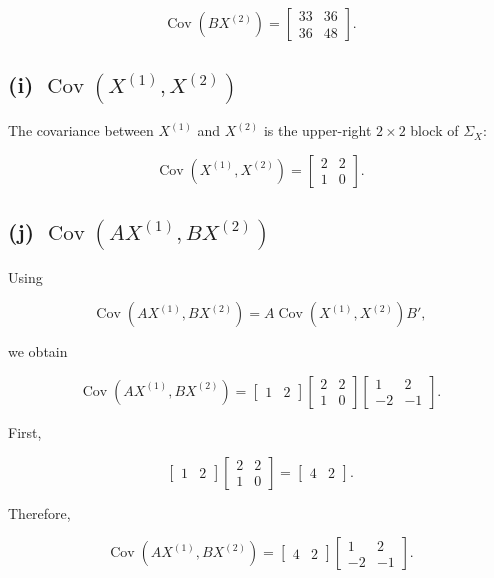 \documentclass[12pt]{article}
\begin{document}
\[
\boxed{
\operatorname{Cov}(BX^{(2)})
=
\begin{bmatrix}
33&36\\
36&48
\end{bmatrix}
}.
\]

\subsection*{(i) $\operatorname{Cov}(X^{(1)},X^{(2)})$}

The covariance between $X^{(1)}$ and $X^{(2)}$ is the upper-right $2\times2$ block of $\Sigma_X$:

\[
\boxed{
\operatorname{Cov}(X^{(1)},X^{(2)})
=
\begin{bmatrix}
2&2\\
1&0
\end{bmatrix}
}.
\]

\subsection*{(j) $\operatorname{Cov}(AX^{(1)},BX^{(2)})$}

Using

\[
\operatorname{Cov}(AX^{(1)},BX^{(2)})
=
A\operatorname{Cov}(X^{(1)},X^{(2)})B',
\]

we obtain

\[
\operatorname{Cov}(AX^{(1)},BX^{(2)})
=
\begin{bmatrix}
1&2
\end{bmatrix}
\begin{bmatrix}
2&2\\
1&0
\end{bmatrix}
\begin{bmatrix}
1&2\\
-2&-1
\end{bmatrix}.
\]

First,

\[
\begin{bmatrix}
1&2
\end{bmatrix}
\begin{bmatrix}
2&2\\
1&0
\end{bmatrix}
=
\begin{bmatrix}
4&2
\end{bmatrix}.
\]

Therefore,

\[
\operatorname{Cov}(AX^{(1)},BX^{(2)})
=
\begin{bmatrix}
4&2
\end{bmatrix}
\begin{bmatrix}
1&2\\
-2&-1
\end{bmatrix}.
\]
\end{document}
